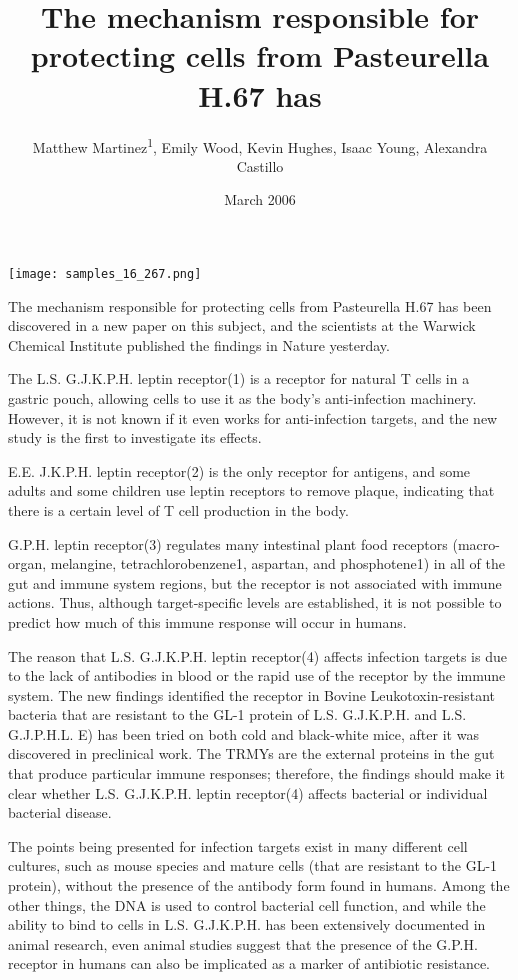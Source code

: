 \documentclass{article}
\title{The mechanism responsible for protecting cells from Pasteurella H.67 has}
\author{Matthew Martinez\textsuperscript{1},  Emily Wood,  Kevin Hughes,  Isaac Young,  Alexandra Castillo}
\affil{\textsuperscript{1}University of California, Los Angeles}
\date{March 2006}
\begin{document}
\maketitle

\begin{center}
\begin{minipage}{0.75\linewidth}
\texttt{[image: samples\_16\_267.png]}
\end{minipage}
\end{center}

The mechanism responsible for protecting cells from Pasteurella H.67 has been discovered in a new paper on this subject, and the scientists at the Warwick Chemical Institute published the findings in Nature yesterday.

The L.S. G.J.K.P.H. leptin receptor(1) is a receptor for natural T cells in a gastric pouch, allowing cells to use it as the body’s anti-infection machinery. However, it is not known if it even works for anti-infection targets, and the new study is the first to investigate its effects.

E.E. J.K.P.H. leptin receptor(2) is the only receptor for antigens, and some adults and some children use leptin receptors to remove plaque, indicating that there is a certain level of T cell production in the body.

G.P.H. leptin receptor(3) regulates many intestinal plant food receptors (macro-organ, melangine, tetrachlorobenzene1, aspartan, and phosphotene1) in all of the gut and immune system regions, but the receptor is not associated with immune actions. Thus, although target-specific levels are established, it is not possible to predict how much of this immune response will occur in humans.

The reason that L.S. G.J.K.P.H. leptin receptor(4) affects infection targets is due to the lack of antibodies in blood or the rapid use of the receptor by the immune system. The new findings identified the receptor in Bovine Leukotoxin-resistant bacteria that are resistant to the GL-1 protein of L.S. G.J.K.P.H. and L.S. G.J.P.H.L. E) has been tried on both cold and black-white mice, after it was discovered in preclinical work. The TRMYs are the external proteins in the gut that produce particular immune responses; therefore, the findings should make it clear whether L.S. G.J.K.P.H. leptin receptor(4) affects bacterial or individual bacterial disease.

The points being presented for infection targets exist in many different cell cultures, such as mouse species and mature cells (that are resistant to the GL-1 protein), without the presence of the antibody form found in humans. Among the other things, the DNA is used to control bacterial cell function, and while the ability to bind to cells in L.S. G.J.K.P.H. has been extensively documented in animal research, even animal studies suggest that the presence of the G.P.H. receptor in humans can also be implicated as a marker of antibiotic resistance.
\end{document}
